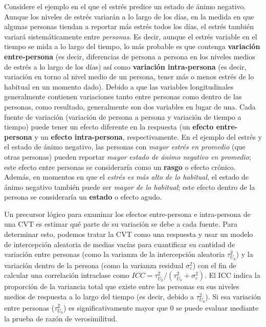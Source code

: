 \documentclass[spanish]{article}
\numberwithin{figure}{subsection}
\numberwithin{equation}{subsection}
\numberwithin{table}{subsection}
\begin{document}
Considere el ejemplo en el que el estrés predice un estado de ánimo negativo.
Aunque los niveles de estrés variarán a lo largo de los días, en la medida en
que algunas personas tiendan a reportar más estrés todos los días, el estrés
también variará sistemáticamente entre \textit{personas}. Es decir, aunque el
estrés variable en el tiempo se mida a lo largo del tiempo, lo más probable es
que contenga \textbf{variación entre-persona} (es decir, diferencias de persona
a persona en los niveles medios de estrés a lo largo de los días) así como
\textbf{variación intra-persona} (es decir, variación en torno al nivel medio
de un persona, tener más o menos estrés de lo habitual en un momento dado).
Debido a que las variables longitudinales generalmente contienen variaciones
tanto entre personas como dentro de las personas, como resultado, generalmente
son dos variables en lugar de una. Cada fuente de variación (variación de
persona a persona y variación de tiempo a tiempo) puede tener un efecto
diferente en la respuesta (un \textbf{efecto entre-persona} y un \textbf{efecto
intra-persona}, respectivamente. En el ejemplo del estrés y el estado de ánimo
negativo, las personas con \textit{mayor estrés en promedio} (que otras
personas) pueden reportar \textit{mayor estado de ánimo negativo en promedio};
este efecto entre personas se consideraría como un \textbf{rasgo} o efecto
crónico. Además, en momentos en que el \textit{estrés es más alto de lo
habitual}, el estado de ánimo negativo también puede ser \textit{mayor de lo
habitual}; este efecto dentro de la persona se consideraría un \textbf{estado}
o efecto agudo.

Un precursor lógico para examinar los efectos entre-persona e intra-persona de
una CVT es estimar qué parte de su variación se debe a cada fuente. Para
determinar esto, podemos tratar la CVT como una respuesta y usar un modelo de
intercepción aleatoria de medias vacías para cuantificar su cantidad de
variación entre personas (como la varianza de la intercepción aleatoria
$\tau^2_{U_0}$) y la variación dentro de la persona (como la varianza residual
$\sigma^2_e$) con el fin de calcular una correlación intraclase como
$ICC = \tau^2_{U_0} / (\tau^2_{U_0} + \sigma^2_e)$. El ICC indica la proporción
de la variancia total que existe entre las personas en sus niveles medios de
respuesta a lo largo del tiempo (es decir, debido a $\tau^2_{U_0}$). Si esa
variación entre personas ($\tau^2_{U_0}$) es significativamente mayor que 0 se
puede evaluar mediante la prueba de razón de verosimilitud.
\end{document}
